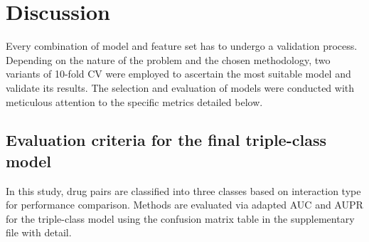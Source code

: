 \documentclass[unnumsec,webpdf,contemporary,large]{oup-authoring-template}%
\theoremstyle{thmstyleone}%
\theoremstyle{thmstyletwo}%
\theoremstyle{thmstylethree}%
\begin{document}
\section{Discussion}\label{sec5}
Every combination of model and feature set has to undergo a validation process. Depending on the nature of the problem and the chosen methodology, two variants of 10-fold CV were employed to ascertain the most suitable model and validate its results. The selection and evaluation of models were conducted with meticulous attention to the specific metrics detailed below.
\subsection{Evaluation criteria for the final triple-class model}\label{subsec2}
In this study, drug pairs are classified into three classes based on interaction type for performance comparison. Methods are evaluated via adapted AUC and AUPR for the triple-class model using the confusion matrix table in the supplementary file with detail.
\end{document}
